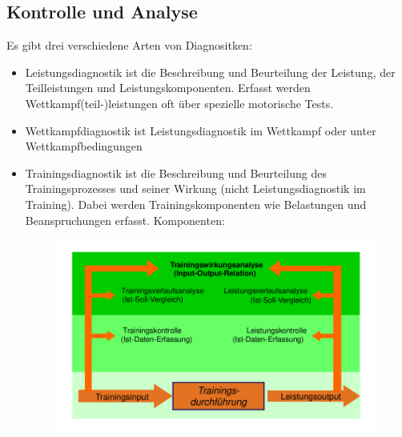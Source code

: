 \subsection{Kontrolle und Analyse}
Es gibt drei verschiedene Arten von Diagnositken:
\begin{itemize}
  \item Leistungsdiagnostik ist die Beschreibung und Beurteilung der Leistung, der Teilleistungen und Leistungskomponenten. Erfasst werden Wettkampf(teil-)leistungen oft über spezielle motorische Tests.
  \item Wettkampfdiagnostik ist Leistungsdiagnostik im Wettkampf oder unter Wettkampfbedingungen
  \item Trainingsdiagnostik ist die Beschreibung und Beurteilung des Trainingsprozesses und seiner Wirkung (nicht Leistungsdiagnostik im Training).
    Dabei werden Trainingskomponenten wie Belastungen und Beanspruchungen erfasst.
    Komponenten:\\
    \begin{figure}[H]
      \centering
      \includegraphics[width=.7\textwidth]{pictures/trainingssteuerung_trainingsdiagnostik_komponenten.png}
    \end{figure}
\end{itemize}
